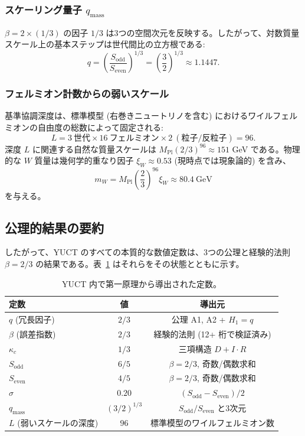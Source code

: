 \documentclass[11pt,a4paper]{article}
\theoremstyle{remark}
\begin{document}
	\subsubsection{スケーリング量子 \(q_{\text{mass}}\)}
	\(\beta = 2 \times (1/3)\) の因子 \(1/3\) は3つの空間次元を反映する。したがって、対数質量スケール上の基本ステップは世代間比の立方根である:
	\[
	\boxed{q = \left(\frac{S_{\mathrm{odd}}}{S_{\mathrm{even}}}\right)^{1/3} = \left(\frac{3}{2}\right)^{1/3} \approx 1.1447}.
	\]
	
	\subsubsection{フェルミオン計数からの弱いスケール}
	基準協調深度は、標準模型 (右巻きニュートリノを含む) におけるワイルフェルミオンの自由度の総数によって固定される:
	\[
	L = 3\ \text{世代} \times 16\ \text{フェルミオン} \times 2\ (\text{粒子/反粒子}) = 96.
	\]
	深度 \(L\) に関連する自然な質量スケールは \(M_{\mathrm{Pl}} (2/3)^{96} \approx 151\) GeV である。物理的な \(W\) 質量は幾何学的重なり因子 \(\xi_W \approx 0.53\) (現時点では現象論的) を含み、
	\[
	m_W = M_{\mathrm{Pl}} \left(\frac{2}{3}\right)^{96} \xi_W \approx 80.4\ \text{GeV}
	\]
	を与える。
	
	\subsection{公理的結果の要約}
	
	したがって、YUCT のすべての本質的な数値定数は、3つの公理と経験的法則 \(\beta=2/3\) の結果である。表~\ref{tab:derived-constants} はそれらをその状態とともに示す。
	
	\begin{table}[H]
		\centering
		\caption{YUCT 内で第一原理から導出された定数。}
		\label{tab:derived-constants}
		\begin{tabular}{l c c}
			\toprule
			\textbf{定数} & \textbf{値} & \textbf{導出元} \\
			\midrule
			\(q\) (冗長因子) & \(2/3\) & 公理 A1, A2 + \(H_1=q\) \\
			\(\beta\) (誤差指数) & \(2/3\) & 経験的法則 (12+ 桁で検証済み) \\
			\(\kappa_c\) & \(1/3\) & 三項構造 \(D+I\!\cdot\!R\) \\
			\(S_{\mathrm{odd}}\) & \(6/5\) & \(\beta=2/3\), 奇数/偶数求和 \\
			\(S_{\mathrm{even}}\) & \(4/5\) & \(\beta=2/3\), 奇数/偶数求和 \\
			\(\sigma\) & \(0.20\) & \((S_{\mathrm{odd}}-S_{\mathrm{even}})/2\) \\
			\(q_{\text{mass}}\) & \((3/2)^{1/3}\) & \(S_{\mathrm{odd}}/S_{\mathrm{even}}\) と3次元 \\
			\(L\) (弱いスケールの深度) & \(96\) & 標準模型のワイルフェルミオン数 \\
			\bottomrule
		\end{tabular}
	\end{table}
	
\end{document}
